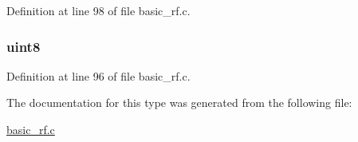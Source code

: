 Definition at line 98 of file basic\_\-rf.c.

\hypertarget{typebasic_rf_tx_state__t_a96c66b0e99eeaeaf87c844d226ecdbf4}{
\subsubsection[{txSeqNumber}]{ {\bfseries uint8 } }}
\label{typebasic_rf_tx_state__t_a96c66b0e99eeaeaf87c844d226ecdbf4}


Definition at line 96 of file basic\_\-rf.c.



The documentation for this type was generated from the following file:\begin{DoxyCompactItemize}
\item 
\hyperlink{basic__rf_8c}{basic\_\-rf.c}\end{DoxyCompactItemize}
